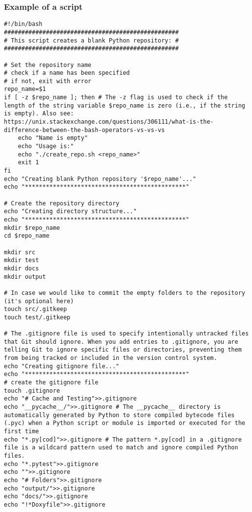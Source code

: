 \documentclass[12pt,a4paper]{article}
\begin{document}
\subsubsection{Example of a script}
\begin{lstlisting}
#!/bin/bash
##################################################
# This script creates a blank Python repository: #
##################################################

# Set the repository name
# check if a name has been specified
# if not, exit with error
repo_name=$1
if [ -z $repo_name ]; then # The -z flag is used to check if the length of the string variable $repo_name is zero (i.e., if the string is empty). Also see: https://unix.stackexchange.com/questions/306111/what-is-the-difference-between-the-bash-operators-vs-vs-vs
    echo "Name is empty"
    echo "Usage is:"
    echo "./create_repo.sh <repo_name>"
    exit 1
fi
echo "Creating blank Python repository '$repo_name'..."
echo "**********************************************"

# Create the repository directory
echo "Creating directory structure..."
echo "**********************************************"
mkdir $repo_name
cd $repo_name

mkdir src
mkdir test
mkdir docs
mkdir output

# In case we would like to commit the empty folders to the repository (it's optional here)
touch src/.gitkeep
touch test/.gitkeep

# The .gitignore file is used to specify intentionally untracked files that Git should ignore. When you add entries to .gitignore, you are telling Git to ignore specific files or directories, preventing them from being tracked or included in the version control system.
echo "Creating gitignore file..."
echo "**********************************************"
# create the gitignore file
touch .gitignore
echo "# Cache and Testing">>.gitignore
echo "__pycache__/">>.gitignore # The __pycache__ directory is automatically generated by Python to store compiled bytecode files (.pyc) when a Python script or module is imported or executed for the first time
echo "*.py[cod]">>.gitignore # The pattern *.py[cod] in a .gitignore file is a wildcard pattern used to match and ignore compiled Python files.
echo "*.pytest">>.gitignore
echo "">>.gitignore
echo "# Folders">>.gitignore
echo "output/">>.gitignore
echo "docs/">>.gitignore
echo "!*Doxyfile">>.gitignore


\end{lstlisting}
\end{document}
